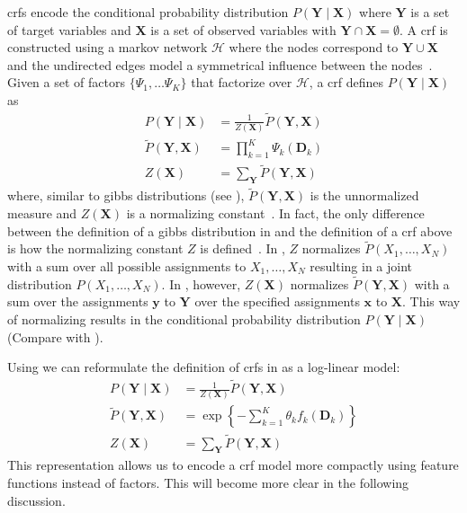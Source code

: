 \bigskip

\Glspl{crf} encode the \gls{conditional probability distribution} $P(\bm{Y}\mid\bm{X})$ where $\bm{Y}$ is a set of \glspl{target variable} and $\bm{X}$ is a set of \glspl{observed variable} with $\bm{Y}\cap\bm{X}=\emptyset$.
A \gls{crf} is constructed using a \gls{markov network} $\mathcal{H}$ where the nodes correspond to $\bm{Y}\cup\bm{X}$ and the undirected edges model a symmetrical influence between the nodes~\citep{koller2009probabilistic}.
Given a set of \glspl{factor} $\{\Psi_1,\dots\Psi_K\}$ that factorize over $\mathcal{H}$, a \gls{crf} defines $P(\bm{Y}\mid\bm{X})$ as~\citep{koller2009probabilistic}
\begin{equation}
  \label{equ:crf-factor}
  \begin{split}
    P(\bm{Y}\mid\bm{X}) & = \frac{1}{Z(\bm{X})}\tilde{P}(\bm{Y},\bm{X}) \\
    \tilde{P}(\bm{Y},\bm{X}) &= \prod_{k=1}^{K}\Psi_k(\bm{D}_k) \\
    Z(\bm{X}) & = \sum_{\bm{Y}}\tilde{P}(\bm{Y},\bm{X})
  \end{split}
\end{equation}
where, similar to \glspl{gibbs distribution} (see ), $\tilde{P}(\bm{Y},\bm{X})$ is the unnormalized measure and $Z(\bm{X})$ is a normalizing constant~\citep{koller2009probabilistic}.
In fact, the only difference between the definition of a \gls{gibbs distribution} in  and the definition of a \gls{crf} above is how the normalizing constant $Z$ is defined~\citep{koller2009probabilistic}.
In , $Z$ normalizes $\tilde{P}(X_1,\dots,X_N)$ with a sum over all possible assignments to $X_1,\dots,X_N$ resulting in a \gls{joint distribution} $P(X_1,\dots,X_N)$.
In , however, $Z(\bm{X})$ normalizes $\tilde{P}(\bm{Y},\bm{X})$ with a sum over the assignments $\bm{y}$ to $\bm{Y}$ over the specified assignments $\bm{x}$ to $\bm{X}$.
This way of normalizing results in the \gls{conditional probability distribution} $P(\bm{Y}\mid\bm{X})$ (Compare with ).

\bigskip

Using  we can reformulate the definition of \glspl{crf} in  as a \gls{log-linear model}:
\begin{equation}
  \label{equ:crf-log-linear}
  \begin{split}
    P(\bm{Y}\mid\bm{X}) & = \frac{1}{Z(\bm{X})}\tilde{P}(\bm{Y},\bm{X}) \\
    \tilde{P}(\bm{Y},\bm{X}) & = \exp\left\{ -\sum_{k=1}^K \theta_k f_k(\bm{D}_k)\right\} \\
    Z(\bm{X}) & = \sum_{\bm{Y}}\tilde{P}(\bm{Y},\bm{X})
  \end{split}
\end{equation}
This representation allows us to encode a \gls{crf} model more compactly using \glspl{feature function} instead of \glspl{factor}.
This will become more clear in the following discussion.

